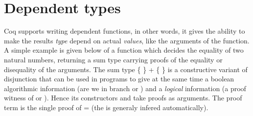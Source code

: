 \section{Dependent types}




   Coq supports writing dependent functions, in other words, it gives the ability to
   make the results \textit{type} depend on actual \textit{values}, like the arguments of the function.
   A simple example is given below of a function which decides the equality of two 
   natural numbers, returning a sum type carrying proofs of the equality or disequality 
   of the arguments. The sum type \{  \} + \{  \} is a constructive variant of disjunction 
   that can be used in programs to give at the same time a boolean algorithmic information 
   (are we in branch  or ) and a \textit{logical} information (a proof witness of  or ).
   Hence its constructors  and  take proofs as arguments. The  proof 
   term is the single proof of  =  (the  is generaly infered automatically).
